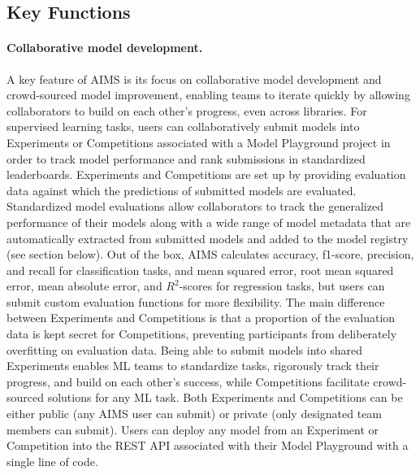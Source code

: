 \subsection{Key Functions}
\paragraph{Collaborative model development.} A key feature of AIMS is its focus on collaborative model development and crowd-sourced model improvement, enabling teams to iterate quickly by allowing collaborators to build on each other's progress, even across libraries. For supervised learning tasks, users can collaboratively submit models into Experiments or Competitions associated with a Model Playground project in order to track model performance and rank submissions in standardized leaderboards. Experiments and Competitions are set up by providing evaluation data against which the predictions of submitted models are evaluated. Standardized model evaluations allow collaborators to track the generalized performance of their models along with a wide range of model metadata that are automatically extracted from submitted models and added to the model registry (see section below). Out of the box, AIMS calculates accuracy, f1-score, precision, and recall for classification tasks, and mean squared error, root mean squared error, mean absolute error, and $R^{2}$-scores for regression tasks, but users can submit custom evaluation functions for more flexibility. The main difference between Experiments and Competitions is that a proportion of the evaluation data is kept secret for Competitions, preventing participants from deliberately overfitting on evaluation data. Being able to submit models into shared Experiments enables ML teams to standardize tasks, rigorously track their progress, and build on each other's success, while Competitions facilitate crowd-sourced solutions for any ML task. Both Experiments and Competitions can be either public (any AIMS user can submit) or private (only designated team members can submit). Users can deploy any model from an Experiment or Competition into the REST API associated with their Model Playground with a single line of code. 

